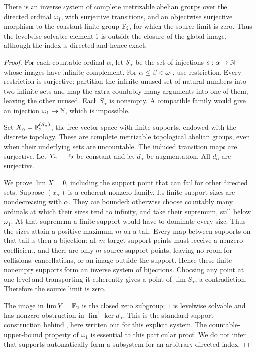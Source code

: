 \begin{theorem}\label{E:uncountable}
There is an inverse system of complete metrizable abelian groups over the directed ordinal $\omega_1$, with surjective transitions, and an objectwise surjective morphism to the constant finite group $\mathbb F_2$, for which the source limit is zero. Thus the levelwise solvable element $1$ is outside the closure of the global image, although the index is directed and hence exact.
\end{theorem}
\begin{proof}
For each countable ordinal $\alpha$, let $S_\alpha$ be the set of injections $s:\alpha\to\mathbb N$ whose images have infinite complement. For $\alpha\leq\beta<\omega_1$, use restriction. Every restriction is surjective: partition the infinite unused set of natural numbers into two infinite sets and map the extra countably many arguments into one of them, leaving the other unused. Each $S_\alpha$ is nonempty. A compatible family would give an injection $\omega_1\to\mathbb N$, which is impossible.

Set $X_\alpha=\mathbb F_2^{(S_\alpha)}$, the free vector space with finite supports, endowed with the discrete topology. These are complete metrizable topological abelian groups, even when their underlying sets are uncountable. The induced transition maps are surjective. Let $Y_\alpha=\mathbb F_2$ be constant and let $d_\alpha$ be augmentation. All $d_\alpha$ are surjective.

We prove $\lim X=0$, including the support point that can fail for other directed sets. Suppose $(x_\alpha)$ is a coherent nonzero family. Its finite support sizes are nondecreasing with $\alpha$. They are bounded: otherwise choose countably many ordinals at which their sizes tend to infinity, and take their supremum, still below $\omega_1$. At that supremum a finite support would have to dominate every size. Thus the sizes attain a positive maximum $m$ on a tail. Every map between supports on that tail is then a bijection: all $m$ target support points must receive a nonzero coefficient, and there are only $m$ source support points, leaving no room for collisions, cancellations, or an image outside the support. Hence these finite nonempty supports form an inverse system of bijections. Choosing any point at one level and transporting it coherently gives a point of $\lim S_\alpha$, a contradiction. Therefore the source limit is zero.

The image in $\lim Y=\mathbb F_2$ is the closed zero subgroup; $1$ is levelwise solvable and has nonzero obstruction in $\lim^1\ker d_\alpha$. This is the standard support construction behind \citet[Corollary 8 and its preceding argument]{Bergman2011}, here written out for this explicit system. The countable-upper-bound property of $\omega_1$ is essential to this particular proof. We do not infer that supports automatically form a subsystem for an arbitrary directed index.
\end{proof}

